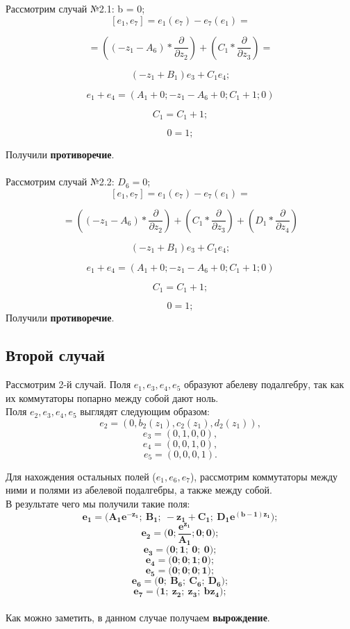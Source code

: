 \href{\href{}{}}{}\documentclass[14pt]{extarticle} %
\begin{document}
Рассмотрим случай №2.1: b = 0; \\

\[
[e_1, e_7] = e_1(e_7) - e_7(e_1) =
\]

\[
= \left( (-z_1 - A_6) * \frac{\partial}{\partial z_2} \right)
+ \left( C_1 * \frac{\partial}{\partial z_3} \right) =
\]

\[
(-z_1 + B_1)e_3 + C_1e_4;
\]

\[
e_1 + e_4 = \left(A_1 + 0; -z_1 - A_6 + 0; C_1 + 1; 0 \right)
\]

\[
C_1 = C_1 + 1;
\]

\[
0 = 1;
\]

Получили \textbf{противоречие}.\\\\
Рассмотрим случай №2.2: $D_6 = 0$; \\

\[
[e_1, e_7] = e_1(e_7) - e_7(e_1) =
\]

\[
= \left( (-z_1 - A_6) * \frac{\partial}{\partial z_2} \right)
+ \left( C_1 * \frac{\partial}{\partial z_3} \right)
+ \left( D_1 * \frac{\partial}{\partial z_4} \right)
\]

\[
(-z_1 + B_1)e_3 + C_1e_4;
\]

\[
e_1 + e_4 = \left(A_1 + 0; -z_1 - A_6 + 0; C_1 + 1; 0 \right)
\]

\[
C_1 = C_1 + 1;
\]

\[
0 = 1;
\]
Получили \textbf{противоречие}.
\subsection{Второй случай}

Рассмотрим 2-й случай. Поля \( e_1, e_3, e_4, e_5 \) образуют абелеву подалгебру, так как их коммутаторы попарно между собой дают ноль. \\

Поля \( e_2, e_3, e_4, e_5 \) выглядят следующим образом:
\[
e_2 = (0, b_2(z_1), c_2(z_1), d_2(z_1)),
\]
\[
e_3 = (0, 1, 0, 0),
\]
\[
e_4 = (0, 0, 1, 0),
\]
\[
e_5 = (0, 0, 0, 1).
\]

Для нахождения остальных полей (\( e_1, e_6, e_7 \)), рассмотрим коммутаторы между ними и полями из абелевой подалгебры, а также между собой. \\

В результате чего мы получили такие поля:
\[
\boldsymbol{e_1 = \big( A_1e^{-z_1};\ B_1;\ -z_1 + C_1;\ D_1e^{(b - 1)z_1}\big);}
\]
\[
\boldsymbol{e_2 = \big( 0; \frac{e^{z_1}}{A_1}; 0; 0\big);}
\]
\[
\boldsymbol{e_3 = \big( 0; 1;\ 0;\ 0 \big);}
\]
\[
\boldsymbol{e_4 = \big( 0; 0; 1; 0 \big);}
\]
\[
\boldsymbol{e_5 = \big( 0; 0; 0; 1 \big);}
\]
\[
\boldsymbol{e_6 = \big( 0;\ B_6;\ C_6;\ D_6 \big);}
\]
\[
\boldsymbol{e_7 = \big( 1;\ z_2;\ z_3;\ bz_4 \big);}
\]\\
Как можно заметить, в данном случае получаем \textbf{вырождение}.
\end{document}
